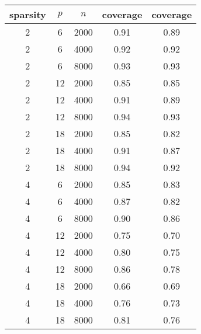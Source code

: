 \begin{table}[ht]
\centering
\begin{tabular}{|ccc|cc|}
  \hline
\hline
sparsity & $p$ & $n$ & coverage & coverage \\ 
  \hline
\hline
2 & 6 & 2000 & 0.91 & 0.89 \\ 
  2 & 6 & 4000 & 0.92 & 0.92 \\ 
  2 & 6 & 8000 & 0.93 & 0.93 \\ 
   \hline
2 & 12 & 2000 & 0.85 & 0.85 \\ 
  2 & 12 & 4000 & 0.91 & 0.89 \\ 
  2 & 12 & 8000 & 0.94 & 0.93 \\ 
   \hline
2 & 18 & 2000 & 0.85 & 0.82 \\ 
  2 & 18 & 4000 & 0.91 & 0.87 \\ 
  2 & 18 & 8000 & 0.94 & 0.92 \\ 
   \hline
\hline
4 & 6 & 2000 & 0.85 & 0.83 \\ 
  4 & 6 & 4000 & 0.87 & 0.82 \\ 
  4 & 6 & 8000 & 0.90 & 0.86 \\ 
   \hline
4 & 12 & 2000 & 0.75 & 0.70 \\ 
  4 & 12 & 4000 & 0.80 & 0.75 \\ 
  4 & 12 & 8000 & 0.86 & 0.78 \\ 
   \hline
4 & 18 & 2000 & 0.66 & 0.69 \\ 
  4 & 18 & 4000 & 0.76 & 0.73 \\ 
  4 & 18 & 8000 & 0.81 & 0.76 \\ 
   \hline
\hline
\end{tabular}
\end{table}
